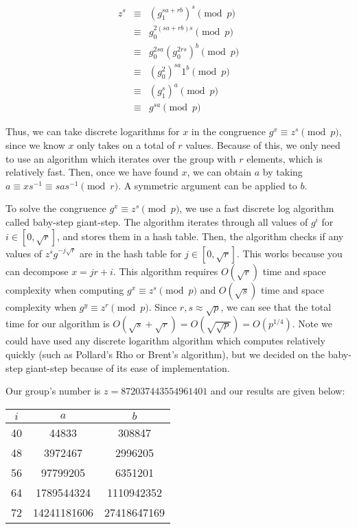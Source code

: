 \begin{enumerate}[(a)]
\begin{eqnarray}
  z^s &\equiv& (g_1^{sa+rb})^s \pmod{p} \\
      &\equiv& g_0^{2(sa + rb)s} \pmod{p} \\
      &\equiv& g_0^{2sa} (g_0^{2rs})^b \pmod{p} \\
      &\equiv& (g_0^{2})^{sa} 1^b \pmod{p} \\
      &\equiv& (g_1^{s})^a \pmod{p} \\
      &\equiv& g^{sa} \pmod{p}
\end{eqnarray}

Thus, we can take discrete logarithms for $x$ in the congruence $g^{x} \equiv z^s \pmod{p}$, since we know $x$ only takes on a total of $r$ values. Because of this, we only need to use an algorithm which iterates over the group with $r$ elements, which is relatively fast. Then, once we have found $x$, we can obtain $a$ by taking $a \equiv x s^{-1} \equiv s a s^{-1} \pmod{r}$. A symmetric argument can be applied to $b$.

To solve the congruence $g^x \equiv z^s \pmod{p}$, we use a fast discrete log algorithm called baby-step giant-step. The algorithm iterates through all values of $g^{i}$ for $i \in [0, \sqrt{r}]$, and stores them in a hash table. Then, the algorithm checks if any values of $z^s g^{-j \sqrt{r}}$ are in the hash table for $j \in [0, \sqrt{r}]$. This works because you can decompose $x = jr + i$. This algorithm requires $O(\sqrt{r})$ time and space complexity when computing $g^x \equiv z^s \pmod{p}$ and $O(\sqrt{s})$ time and space complexity when $g^y \equiv z^r \pmod{p}$. Since $r,s \approx \sqrt{p}$, we can see that the total time for our algorithm is $O(\sqrt{s} + \sqrt{r}) = O(\sqrt{\sqrt{p}}) = O(p^{1/4})$. Note we could have used any discrete logarithm algorithm which computes relatively quickly (such as Pollard's Rho or Brent's algorithm), but we decided on the baby-step giant-step because of its ease of implementation.

Our group's number is $z = 872037443554961401$ and our results are given below:
\begin{table}[h!]
  \begin{tabular}{c | c c}
    $i$ & $a$ & $b$ \\
    \hline \hline
    40 & 44833 & 308847 \\
    48 & 3972467 & 2996205 \\
    56 & 97799205 & 6351201 \\
    64 & 1789544324 & 1110942352 \\
    72 & 14241181606 & 27418647169
  \end{tabular}
\end{table}

\end{enumerate}
